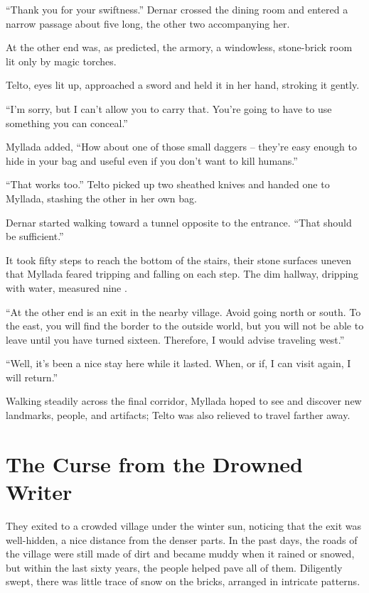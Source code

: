 ``Thank you for your swiftness.'' Dernar crossed the dining room and entered a narrow passage about five \veti{} long, the other two accompanying her.

At the other end was, as predicted, the armory, a windowless, stone-brick room lit only by magic torches.

Telto, eyes lit up, approached a sword and held it in her hand, stroking it gently.

``I'm sorry, but I can't allow you to carry that. You're going to have to use something you can conceal.''

Myllada added, ``How about one of those small daggers -- they're easy enough to hide in your bag and useful even if you don't want to kill humans.''

``That works too.'' Telto picked up two sheathed knives and handed one to Myllada, stashing the other in her own bag.

Dernar started walking toward a tunnel opposite to the entrance. ``That should be sufficient.''

It took fifty steps to reach the bottom of the stairs, their stone surfaces uneven that Myllada feared tripping and falling on each step. The dim hallway, dripping with water, measured nine \eletyn.

``At the other end is an exit in the nearby village. Avoid going north or south. To the east, you will find the border to the outside world, but you will not be able to leave until you have turned sixteen. Therefore, I would advise traveling west.''

``Well, it's been a nice stay here while it lasted. When, or if, I can visit again, I will return.''

Walking steadily across the final corridor, Myllada hoped to see and discover new landmarks, people, and artifacts; Telto was also relieved to travel farther away.

\chapter{The Curse from the Drowned Writer}

They exited to a crowded village under the winter sun, noticing that the exit was well-hidden, a nice distance from the denser parts. In the past days, the roads of the village were still made of dirt and became muddy when it rained or snowed, but within the last sixty years, the people helped pave all of them. Diligently swept, there was little trace of snow on the bricks, arranged in intricate patterns.

